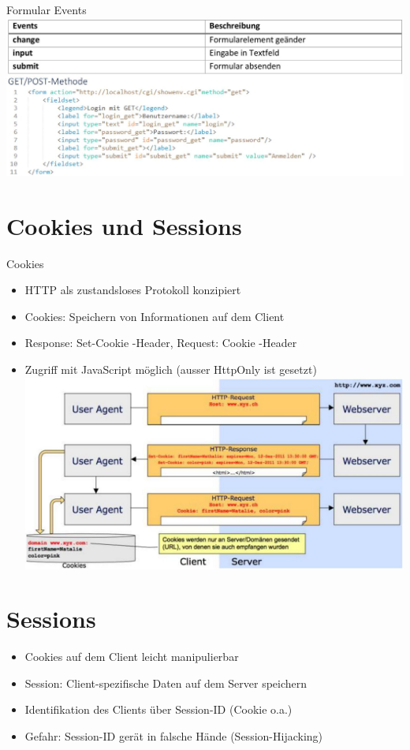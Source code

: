 \documentclass[10pt]{article}
\begin{document}
Formular Events\\
\includegraphics[width=\linewidth]{images/2024_12_29_858f09cde51177c71657g-30}

\section*{Cookies und Sessions}
Cookies

\begin{itemize}
  \item HTTP als zustandsloses Protokoll konzipiert
  \item Cookies: Speichern von Informationen auf dem Client
  \item Response: Set-Cookie -Header, Request: Cookie -Header
  \item Zugriff mit JavaScript möglich (ausser HttpOnly ist gesetzt)\\
\includegraphics[width=\linewidth]{images/2024_12_29_858f09cde51177c71657g-31}
\end{itemize}

\section*{Sessions}
\begin{itemize}
  \item Cookies auf dem Client leicht manipulierbar
  \item Session: Client-spezifische Daten auf dem Server speichern
  \item Identifikation des Clients über Session-ID (Cookie o.a.)
  \item Gefahr: Session-ID gerät in falsche Hände (Session-Hijacking)
\end{itemize}
\end{document}
